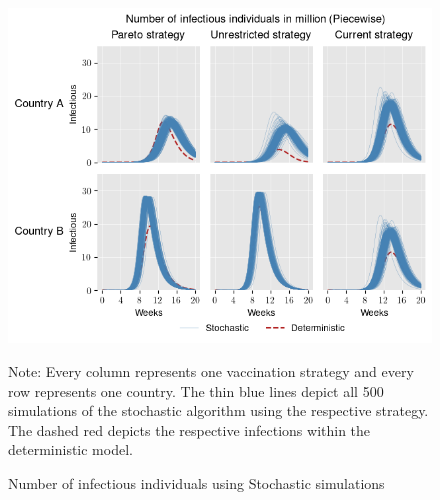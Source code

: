 \begin{figure}[h!]
\centering
\includegraphics[scale=0.85]{images/piecewise_stochastic_infectious.png}\\
\begin{flushleft}
\scriptsize{Note:} Every column represents one vaccination strategy and every row represents one country. The thin blue lines depict all 500 simulations of the stochastic algorithm using the respective strategy. The dashed red depicts the respective infections within the deterministic model. 
\end{flushleft}
\caption{Number of infectious individuals using Stochastic simulations}
\label{fig:results_piecewise_infectious_dead_stochastic}
\end{figure}






